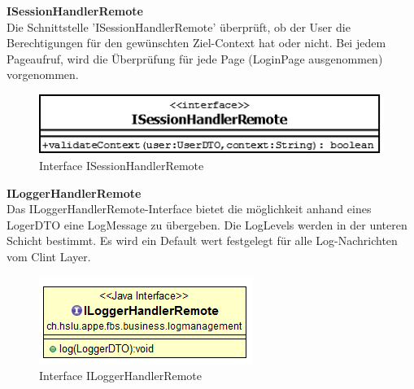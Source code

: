 \textbf{ISessionHandlerRemote}\\
Die Schnittstelle 'ISessionHandlerRemote' überprüft, ob der User die Berechtigungen für den gewünschten Ziel-Context hat oder nicht. Bei jedem Pageaufruf, wird die Überprüfung für jede Page (LoginPage ausgenommen) vorgenommen.
\begin{figure}[H]
	\includegraphics[width=0.5\linewidth]{Images/ISessionHandlerRemonte}
	\caption{Interface ISessionHandlerRemote}
	\label{fig:if-ISessionHandlerRemote}
\end{figure}

\textbf{ILoggerHandlerRemote}\\
Das ILoggerHandlerRemote-Interface bietet die möglichkeit anhand eines LogerDTO eine LogMessage zu übergeben. Die LogLevels werden in der unteren Schicht bestimmt. Es wird ein Default wert festgelegt für alle Log-Nachrichten vom Clint Layer.
\begin{figure}[H]
	\includegraphics[width=0.5\linewidth]{Images/ILoggerHandlerRemonte}
	\caption{Interface ILoggerHandlerRemote}
	\label{fig:if-ILoggerHandlerRemote}
\end{figure}








